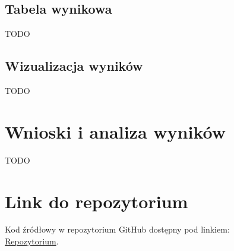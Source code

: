 \documentclass[11pt]{article}
\begin{document}
\subsection{Tabela wynikowa}\label{subsec:tabela-wynikowa}

TODO

\subsection{Wizualizacja wyników}\label{subsec:wizualizacja-wynikow}

TODO


\section{Wnioski i analiza wyników}\label{sec:wnioski}

TODO

\section{Link do repozytorium}\label{sec:link-do-repo}
Kod źródłowy w repozytorium GitHub dostępny pod linkiem: \\
\href{https://github.com/KotZPolibudy/PUT_IMO/tree/main/Lab3%20-%20Local_augmented}{Repozytorium}.
\end{document}
